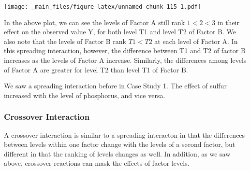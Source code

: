 \documentclass[
]{book}
\begin{document}
\texttt{[image: \_main\_files/figure-latex/unnamed-chunk-115-1.pdf]}

In the above plot, we can see the levels of Factor A still rank \(1<2<3\) in their effect on the observed value Y, for both level T1 and level T2 of Factor B. We also note that the levels of Factor B rank \(T1<T2\) at each level of Factor A. In this spreading interaction, however, the difference between T1 and T2 of factor B increases as the levels of Factor A increase. Similarly, the differences among levels of Factor A are greater for level T2 than level T1 of Factor B.

We saw a spreading interaction before in Case Study 1. The effect of sulfur increased with the level of phosphorus, and vice versa.

\hypertarget{crossover-interaction}{%
\subsubsection{Crossover Interaction}\label{crossover-interaction}}

A crossover interaction is similar to a spreading interacton in that the differences between levels within one factor change with the levels of a second factor, but different in that the ranking of levels changes as well. In addition, as we saw above, crossover reactions can mask the effects of factor levels.
\end{document}
